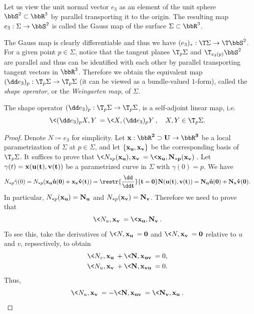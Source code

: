 \begin{defn}
    Let us view the unit normal vector $e_3$ as an element of the unit sphere $\bbS^2\subset\bbR^3$ by parallel transporting it to the origin. The resulting map $e_3:\Sigma\to \bbS^2$ is called the Gauss map of the surface $\Sigma\subset \bbR^3$.
\end{defn}

The Gauss map is clearly differentiable and thus we have $(e_3)_\ast:\T\Sigma\to \T\bbS^2$. For a given point $p\in\Sigma$, notice that the tangent planes $\T_p\Sigma$ and $\T_{e_3(p)}\bbS^2$ are parallel and thus can be identified with each other by parallel transporting tangent vectors in $\bbR^3$. Therefore we obtain the equivalent map $(\dd e_3)_{p}:\T_p\Sigma\to \T_p\Sigma$ (it can be viewed as a bundle-valued $1$-form), called the \emph{shape operator}, or the \emph{Weingarten map}, of $\Sigma$.

\begin{lem}
    The shape operator $(\dd e_3)_{p}:\T_p\Sigma\to \T_p\Sigma$, is a self-adjoint linear map, i.e.\ 
    \[\<(\dd e_3)_{p}X,Y\>=\<X,(\dd e_3)_{p}Y\>,\quad X,Y\in \T_p\Sigma.\]
\end{lem}
\begin{proof}
    Denote $N\coloneqq e_3$ for simplicity. Let $\bf{x}:\bbR^2\supset U\to \bbR^3$ be a local parametrization of $\Sigma$ at $p\in\Sigma$, and let $\{\bf{x}_u, \bf{x}_v\}$ be the corresponding basis of $\T_p\Sigma$. It suffices to prove that $\<N_{\ast p}(\bf{x}_u),\bf{x}_v\>=\<\bf{x}_u,N_{\ast p}(\bf{x}_v)\>$. Let $\gamma(t)=\bf{x}(u(t),v(t))$ be a parametrized curve in $\Sigma$ with $\gamma(0)=p$. We have 
    \[N_{\ast p}\dot\gamma(0)=N_{\ast p}(\bf{x}_u \dot u(0)+\bf{x}_v \dot v(t))=\restr{\frac{\dd}{\dd t}}{t=0}N(u(t),v(t))=N_u \dot u(0)+N_v\dot v(0).\]
    In particular, $N_{\ast p}(\bf{x}_u)=N_u$ and $N_{\ast p}(\bf{x}_v)=N_v$. Therefore we need to prove that 
    \[\<N_u,\bf{x}_v\>=\<\bf{x}_u,N_v\>.\]
    To see this, take the derivatives of $\<N,\bf{x}_u\>=0$ and $\<N,\bf{x}_v\>=0$ relative to $u$ and $v$, repsectively, to obtain 
    \begin{align}
        \<N_v,\bf{x}_u\>+\<N,\bf{x}_{uv}\>&=0,\\
        \<N_u,\bf{x}_v\>+\<N,\bf{x}_{vu}\>&=0.
    \end{align}
    Thus, 
    \[\<N_u,\bf{x}_v\>=-\<N,\bf{x}_{uv}\>=\<N_v,\bf{x}_u\>.\]
\end{proof}

